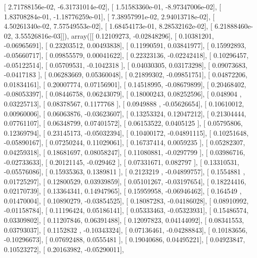 \documentclass{article}
\begin{document}
       [  2.71788156e-02,  -6.31731014e-02],
       [  1.51583360e-01,  -8.97347006e-02],
       [  1.83708284e-01,  -1.18776259e-01],
       [  7.38957991e-02,   2.94013718e-02],
       [  4.50261340e-02,   7.57549553e-02],
       [  1.68454173e-01,   8.28532162e-02],
       [  6.21888460e-02,   3.55526816e-03]]), array([[ 0.12109273, -0.02848296],
       [ 0.10381201, -0.06965691],
       [ 0.23203512,  0.00493838],
       [ 0.11990591,  0.03841977],
       [ 0.15992893, -0.05660717],
       [ 0.09855579,  0.00041622],
       [ 0.22323136, -0.02242418],
       [ 0.10296457, -0.05122514],
       [ 0.05709531, -0.1042318 ],
       [ 0.04030305,  0.03173298],
       [ 0.09073683, -0.0417183 ],
       [ 0.06283669,  0.05360048],
       [ 0.21899302, -0.09851751],
       [ 0.04872206,  0.01834161],
       [ 0.20007774,  0.07156901],
       [ 0.14518995, -0.08679899],
       [ 0.20468402, -0.08053397],
       [ 0.08446758,  0.06243079],
       [ 0.18000243,  0.08252596],
       [ 0.048904  ,  0.03225713],
       [ 0.08378567,  0.1177768 ],
       [ 0.0949888 , -0.05626654],
       [ 0.10610012,  0.00960006],
       [ 0.06063876, -0.03623607],
       [ 0.13253324,  0.12047212],
       [ 0.21304444,  0.07761107],
       [ 0.06348799,  0.07401572],
       [ 0.06153522,  0.0405125 ],
       [ 0.05795806,  0.12369794],
       [ 0.23145173, -0.05032394],
       [ 0.10400172, -0.04891115],
       [ 0.10251648, -0.05890167],
       [ 0.07250244,  0.11029061],
       [ 0.16737414,  0.0059235 ],
       [ 0.05282307,  0.04259318],
       [ 0.18681697,  0.08058247],
       [ 0.11080881, -0.0297799 ],
       [ 0.03986716, -0.02733633],
       [ 0.20121145, -0.029462  ],
       [ 0.07331671,  0.082797  ],
       [ 0.13310531, -0.05576086],
       [ 0.15935363,  0.1389811 ],
       [ 0.2123219 , -0.04899757],
       [ 0.1554881 ,  0.01725297],
       [ 0.12800529,  0.03939859],
       [ 0.05101267, -0.03197654],
       [ 0.18224416,  0.02170739],
       [ 0.13364341,  0.14947965],
       [ 0.15959958, -0.06946462],
       [ 0.164549  ,  0.01470004],
       [ 0.10890279, -0.03854525],
       [ 0.18087283, -0.04186028],
       [ 0.08910992, -0.01158784],
       [ 0.11196424,  0.05186141],
       [ 0.05333463, -0.05323931],
       [ 0.15486574,  0.03309802],
       [ 0.11207846,  0.06391488],
       [ 0.12097823,  0.04144092],
       [ 0.08341553,  0.03793037],
       [ 0.1152832 , -0.10343324],
       [ 0.07136461, -0.04288843],
       [ 0.10183656, -0.10296673],
       [ 0.07692488,  0.0555481 ],
       [ 0.19040686,  0.04495221],
       [ 0.04923847,  0.10523272],
       [ 0.20163982, -0.05290011],
\end{document}

